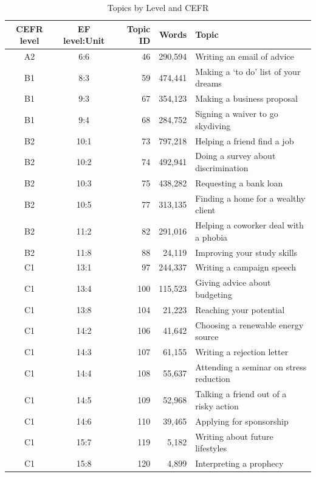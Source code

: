 
\begin{table}[ht]
\centering
\renewcommand{\arraystretch}{1.3}
\begin{tabular}{ccrrl}
\hline
\textbf{CEFR level} &\textbf{EF level:Unit}    & \textbf{Topic ID} & \textbf{Words} & \textbf{Topic} \\
\hline
 A2 &  6:6  & 46  &  290{,}594 & Writing an email of advice              \\
 B1 &  8:3  & 59  &  474{,}441 & Making a `to do' list of your dreams    \\
 B1 &  9:3  & 67  &  354{,}123 & Making a business proposal              \\
 B1 &  9:4  & 68  &  284{,}752 & Signing a waiver to go skydiving        \\
 B2 &  10:1 & 73  &  797{,}218 & Helping a friend find a job             \\
 B2 &  10:2 & 74  &  492{,}941 & Doing a survey about discrimination     \\
 B2 &  10:3 & 75  &  438{,}282 & Requesting a bank loan                  \\
 B2 &  10:5 & 77  &  313{,}135 & Finding a home for a wealthy client     \\
 B2 &  11:2 & 82  &  291{,}016 & Helping a coworker deal with a phobia   \\
 B2 &  11:8 & 88  &   24{,}119 & Improving your study skills             \\
 C1 &  13:1 & 97  &  244{,}337 & Writing a campaign speech               \\
 C1 &  13:4 & 100 &  115{,}523 & Giving advice about budgeting           \\
 C1 &  13:8 & 104 &   21{,}223 & Reaching your potential                 \\
 C1 &  14:2 & 106 &   41{,}642 & Choosing a renewable energy source      \\
 C1 &  14:3 & 107 &   61{,}155 & Writing a rejection letter              \\
 C1 &  14:4 & 108 &   55{,}637 & Attending a seminar on stress reduction \\
 C1 &  14:5 & 109 &   52{,}968 & Talking a friend out of a risky action  \\
 C1 &  14:6 & 110 &   39{,}465 & Applying for sponsorship                \\
 C1 &  15:7 & 119 &    5{,}182 & Writing about future lifestyles         \\
 C1 &  15:8 & 120 &    4{,}899 & Interpreting a prophecy                 \\
\hline
\end{tabular}
\caption{Topics by Level and CEFR}
\label{tab:topics}
\end{table}

